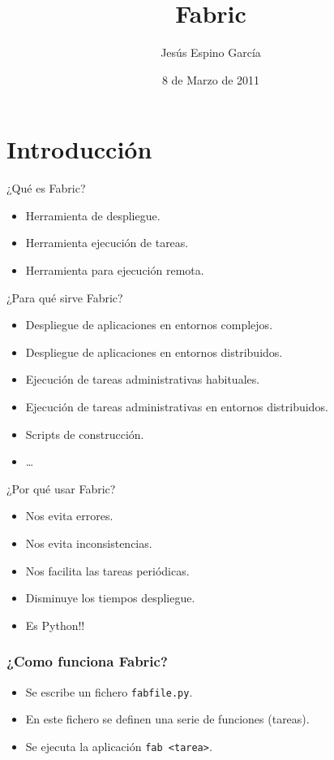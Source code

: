 \documentclass[10pt]{beamer}
\title{Fabric}
\author{Jesús Espino García}
\date{8 de Marzo de 2011}
\institute[GUL UC3M]{Python-ESP-Centro}
\begin{document}
  \frame{\maketitle}


  \section*{Introducción}
  \begin{frame}{¿Qué es Fabric?}
    \begin{itemize}
      \item Herramienta de despliegue.
      \item Herramienta ejecución de tareas.
      \item Herramienta para ejecución remota.
    \end{itemize}
  \end{frame}
  
  \begin{frame}{¿Para qué sirve Fabric?}
    \begin{itemize}
      \item Despliegue de aplicaciones en entornos complejos.
      \item Despliegue de aplicaciones en entornos distribuidos.
      \item Ejecución de tareas administrativas habituales.
      \item Ejecución de tareas administrativas en entornos distribuidos.
      \item Scripts de construcción.
      \item \dots{}
    \end{itemize}
  \end{frame}
  
  \begin{frame}{¿Por qué usar Fabric?}
    \begin{itemize}
      \item Nos evita errores.
      \item Nos evita inconsistencias.
      \item Nos facilita las tareas periódicas.
      \item Disminuye los tiempos despliegue.
      \item Es Python!!
    \end{itemize}
  \end{frame}

  \begin{frame}[containsverbatim]
    \frametitle{¿Como funciona Fabric?}
    \begin{itemize}
      \item Se escribe un fichero \verb+fabfile.py+.
      \item En este fichero se definen una serie de funciones (tareas).
      \item Se ejecuta la aplicación \verb+fab <tarea>+.
    \end{itemize}
  \end{frame}
  
\end{document}

